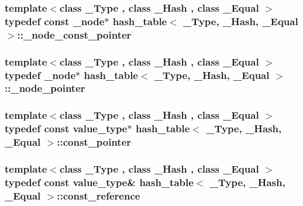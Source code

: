\subsubsection[{\+\_\+node\+\_\+const\+\_\+pointer}]{\setlength{\rightskip}{0pt plus 5cm}template$<$class \+\_\+\+Type , class \+\_\+\+Hash , class \+\_\+\+Equal $>$ typedef const {\bf \+\_\+node}$\ast$ {\bf hash\+\_\+table}$<$ \+\_\+\+Type, \+\_\+\+Hash, \+\_\+\+Equal $>$\+::{\bf \+\_\+node\+\_\+const\+\_\+pointer}}\label{classhash__table_a94de4cb648de7c459348be7df2c9ebd3}
\hypertarget{classhash__table_a7e82c643192604e0bcb21b1d7208df28}{}
\subsubsection[{\+\_\+node\+\_\+pointer}]{\setlength{\rightskip}{0pt plus 5cm}template$<$class \+\_\+\+Type , class \+\_\+\+Hash , class \+\_\+\+Equal $>$ typedef {\bf \+\_\+node}$\ast$ {\bf hash\+\_\+table}$<$ \+\_\+\+Type, \+\_\+\+Hash, \+\_\+\+Equal $>$\+::{\bf \+\_\+node\+\_\+pointer}}\label{classhash__table_a7e82c643192604e0bcb21b1d7208df28}
\hypertarget{classhash__table_a8f09397b7443438bc50e7f6bfc9be9d6}{}
\subsubsection[{const\+\_\+pointer}]{\setlength{\rightskip}{0pt plus 5cm}template$<$class \+\_\+\+Type , class \+\_\+\+Hash , class \+\_\+\+Equal $>$ typedef const {\bf value\+\_\+type}$\ast$ {\bf hash\+\_\+table}$<$ \+\_\+\+Type, \+\_\+\+Hash, \+\_\+\+Equal $>$\+::{\bf const\+\_\+pointer}}\label{classhash__table_a8f09397b7443438bc50e7f6bfc9be9d6}
\hypertarget{classhash__table_a84b60c6fc08ecba763d5e3cfa7065e8d}{}
\subsubsection[{const\+\_\+reference}]{\setlength{\rightskip}{0pt plus 5cm}template$<$class \+\_\+\+Type , class \+\_\+\+Hash , class \+\_\+\+Equal $>$ typedef const {\bf value\+\_\+type}\& {\bf hash\+\_\+table}$<$ \+\_\+\+Type, \+\_\+\+Hash, \+\_\+\+Equal $>$\+::{\bf const\+\_\+reference}}\label{classhash__table_a84b60c6fc08ecba763d5e3cfa7065e8d}
\hypertarget{classhash__table_a7f48994c34ddc1f8a19ffa7dc3821b40}{}

